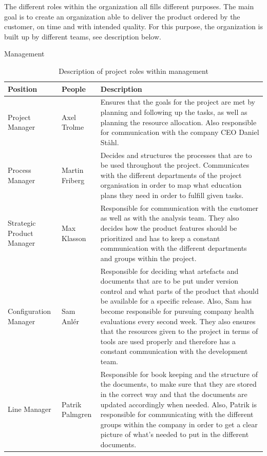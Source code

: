 The different roles within the organization all fills different purposes. The main goal is to create an organization able to deliver the product ordered by the customer, on time and with intended quality. For this purpose, the organization is built up by different teams, see description below. 
\begin{table}[H]

\begin{center}
\begin{huge}
    Management
\end{huge}
\begin{tabular}{ | m{4cm} |m{3cm} |m{10cm}| } 
\hline
\textbf{Position} & \textbf{People} & \textbf{Description} \\ 
\hline
Project Manager & Axel Trolme & Ensures that the goals for the project are met by planning and following up the tasks, as well as planning the resource allocation. Also responsible for communication with the company CEO Daniel Ståhl. \\
\hline
Process Manager & Martin Friberg & Decides and structures the processes that are to be used throughout the project. Communicates with the different departments of the project organisation in order to map what education plans they need in order to fulfill given tasks.  \\
\hline
Strategic Product Manager & Max Klasson & Responsible for communication with the customer as well as with the analysis team. They also decides how the product features should be prioritized and has to keep a constant communication with the different departments and groups within the project.  \\
\hline
Configuration Manager & Sam Anlér & Responsible for deciding what artefacts and documents that are to be put under version control and what parts of the product that should be available for a specific release. Also, Sam has become responsible for pursuing company health evaluations every second week. They also ensures that the resources given to the project in terms of tools are used properly and therefore has a constant communication with the development team. \\
\hline
Line Manager & Patrik Palmgren & Responsible for book keeping and the structure of the documents, to make sure that they are stored in the correct way and that the documents are updated accordingly when needed. Also, Patrik is responsible for communicating with the different groups within the company in order to get a clear picture of what's needed to put in the different documents.   \\
\hline
\end{tabular}
\end{center}
\caption{\label{tab:table-name}Description of project roles within management}
\end{table}
